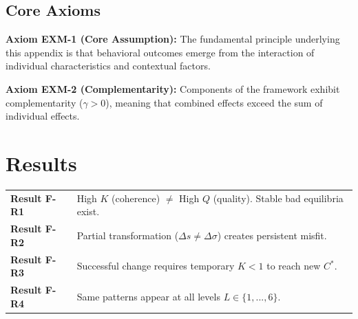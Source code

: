 % 
\subsection{Core Axioms}
\label{sec:exm-axioms}

\begin{tcolorbox}[colback=yellow!5!white,colframe=yellow!75!black,title=Axiom EXM-1: Fundamental Principle]
\textbf{Axiom EXM-1 (Core Assumption):}
The fundamental principle underlying this appendix is that behavioral outcomes
emerge from the interaction of individual characteristics and contextual factors.
\end{tcolorbox}

\begin{tcolorbox}[colback=yellow!5!white,colframe=yellow!75!black,title=Axiom EXM-2: Complementarity]
\textbf{Axiom EXM-2 (Complementarity):}
Components of the framework exhibit complementarity ($\gamma > 0$), meaning
that combined effects exceed the sum of individual effects.
\end{tcolorbox}


\section{Results}

\begin{tcolorbox}[colback=orange!5!white, colframe=orange!75!black,
    title=\textbf{Key Results: Universal Patterns}]

\begin{tabular}{@{}p{3cm}p{9cm}@{}}
\textbf{Result F-R1} & High $K$ (coherence) $\neq$ High $Q$ (quality). Stable bad equilibria exist. \\
\textbf{Result F-R2} & Partial transformation ($\Delta s \neq \Delta \sigma$) creates persistent misfit. \\
\textbf{Result F-R3} & Successful change requires temporary $K < 1$ to reach new $C^*$. \\
\textbf{Result F-R4} & Same patterns appear at all levels $L \in \{1,...,6\}$. \\
\end{tabular}

\end{tcolorbox}


